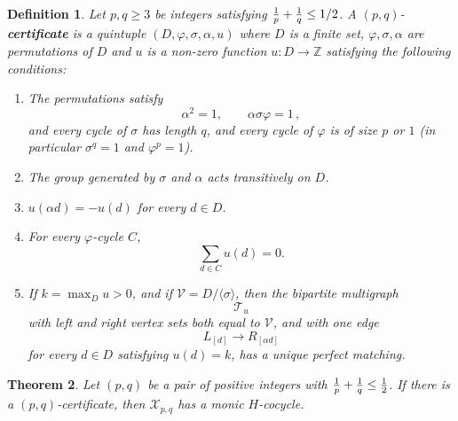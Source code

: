 \documentclass[11pt]{article}
\newtheorem{theorem}{Theorem}[section]
\newtheorem{definition}[theorem]{Definition}
\theoremstyle{remark}
\newcommand{\cX}{\mathcal X}
\newcommand{\Z}{\mathbb Z}
\begin{document}
\begin{definition}
\label{def:admissible_permutations} Let $p,q\geq 3$ be integers satisfying ${1 \over p} + {1\over q} \leq 1/2$. A $(p,q)$-{\bf certificate} is a quintuple $(D,\varphi,\sigma,\alpha,u)$ where $D$ is a finite set, $\varphi,\sigma,\alpha$ are permutations of $D$ and $u$ is a non-zero function $u:D\to \Z$ satisfying the following conditions:
\begin{enumerate}%
\item The permutations satisfy 
\[
  \alpha^2=1,
  \qquad
  \alpha\sigma\varphi=1 \, ,
\]
and every cycle of $\sigma$ has length $q$, and every cycle of $\varphi$ is of size $p$ or $1$ (in particular $\sigma^q=1$ and $\varphi^p=1$).



\item The group generated by \(\sigma\) and \(\alpha\) acts transitively on \(D\).

\item \(u(\alpha d)=-u(d)\) for every \(d\in D\).
\item For every \(\varphi\)-cycle \(C\),
\[
  \sum_{d\in C}u(d)=0.
\]
\item If \(k=\max_D u>0\), and if \(\mathcal V=D/\langle\sigma\rangle\), then the bipartite multigraph
\[
  \mathcal T_u
\]
with left and right vertex sets both equal to \(\mathcal V\), and with one edge
\[
  L_{[d]}\longrightarrow R_{[\alpha d]}
\]
for every \(d\in D\) satisfying \(u(d)=k\), has a unique perfect matching.

\end{enumerate}
\end{definition}

\begin{theorem} \label{thm:criterion_permutation} Let $(p,q)$ be a pair of positive integers with ${1 \over p}+{1 \over q} \leq {1 \over 2}$. If  there is a $(p,q)$-certificate, then $\cX_{p,q}$ has a monic $H$-cocycle.
\end{theorem}
\end{document}
